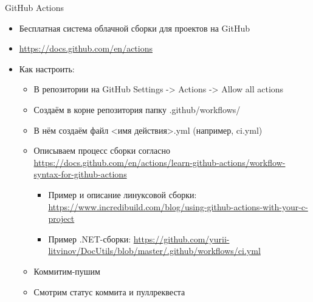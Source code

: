 \documentclass{../../slides-style}
\begin{document}
    \begin{frame}{GitHub Actions}
        \begin{itemize}
            \item Бесплатная система облачной сборки для проектов на GitHub
            \item \url{https://docs.github.com/en/actions}
            \item Как настроить:
            \begin{itemize}
                \item В репозитории на GitHub Settings -> Actions -> Allow all actions
                \item Создаём в корне репозитория папку .github/workflows/
                \item В нём создаём файл <имя действия>.yml (например, ci.yml)
                \item Описываем процесс сборки согласно \url{https://docs.github.com/en/actions/learn-github-actions/workflow-syntax-for-github-actions}
                \begin{itemize}
                    \item Пример и описание линуксовой сборки: \url{https://www.incredibuild.com/blog/using-github-actions-with-your-c-project}
                    \item Пример .NET-сборки: \url{https://github.com/yurii-litvinov/DocUtils/blob/master/.github/workflows/ci.yml}
                \end{itemize}
                \item Коммитим-пушим
                \item Смотрим статус коммита и пуллреквеста
            \end{itemize}
        \end{itemize}
    \end{frame}
\end{document}
